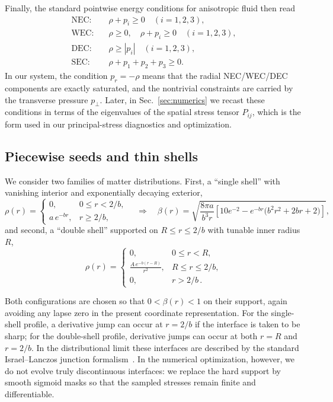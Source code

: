 \documentclass[11pt]{article}
\begin{document}
Finally, the standard pointwise energy conditions for anisotropic fluid then read~\cite{HawkingEllis1973,Barcelo:2000zf}
\begin{align}
\text{NEC}:&\quad \rho + p_i \ge 0\quad (i=1,2,3), \\
\text{WEC}:&\quad \rho \ge 0,\quad \rho + p_i \ge 0\quad (i=1,2,3), \\
\text{DEC}:&\quad \rho \ge |p_i|\quad (i=1,2,3), \\
\text{SEC}:&\quad \rho + p_1 + p_2 + p_3 \ge 0.
\end{align}
In our system, the condition $p_r = -\rho$ means that the radial NEC/WEC/DEC components are exactly saturated, and the nontrivial constraints are carried by the transverse pressure $p_\perp$. Later, in Sec.~\ref{sec:numerics} we recast these conditions in terms of the eigenvalues of the spatial stress tensor $P_{ij}$, which is the form used in our principal-stress diagnostics and optimization.

\subsection{Piecewise seeds and thin shells}
We consider two families of matter distributions. First, a ``single shell'' with vanishing interior and exponentially decaying exterior,
\begin{equation}
\rho(r)=\begin{cases}
 0, & 0\le r<2/b,\\[2pt]
 a\,e^{-br}, & r\ge 2/b,
\end{cases}
\quad\Longrightarrow\quad
\beta(r) = \sqrt{\frac{8\pi a}{b^3 r}\left[10e^{-2} - e^{-br}\bigl(b^2r^2+2br+2\bigr)\right]},
\end{equation}
and second, a ``double shell'' supported on $R\le r\le 2/b$ with tunable inner radius $R$,
\begin{equation}
\rho(r)=\begin{cases}
0, & 0\le r<R,\\[2pt]
\frac{A\,e^{-b(r-R)}}{r^2}, & R\le r \le 2/b,\\[2pt]
0, & r>2/b\,.
\end{cases}
\end{equation}

Both configurations are chosen so that $0<\beta(r)<1$ on their support, again avoiding any lapse zero in the present coordinate representation. For the single-shell profile, a derivative jump can occur at $r=2/b$ if the interface is taken to be sharp; for the double-shell profile, derivative jumps can occur at both $r=R$ and $r=2/b$. In the distributional limit these interfaces are described by the standard Israel--Lanczos junction formalism~\cite{Israel:1966rt,Lanczos:1922,Barrabes:1991ng,Mars:1993gj,Steinbauer:2006qi}. In the numerical optimization, however, we do not evolve truly discontinuous interfaces: we replace the hard support by smooth sigmoid masks so that the sampled stresses remain finite and differentiable.
\end{document}
